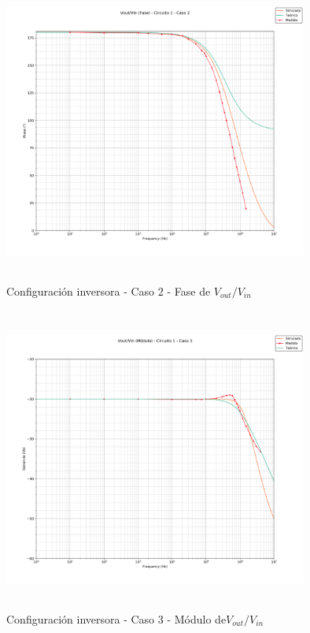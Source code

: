 \begin{figure}[H] %
	\centering
	\includegraphics[width=10cm,height=10cm,keepaspectratio]{../EJ1/00GRAFICOS/c1c2/c1c2voviFASE.png}
	\caption{Configuración inversora - Caso 2 - Fase de $V_{out}/V_{in}$ }
	\label{c1c2voviP}
\end{figure}

\begin{figure}[H] %
	\centering
	\includegraphics[width=10cm,height=10cm,keepaspectratio]{../EJ1/00GRAFICOS/c1c3/c1c3voviMod.png}
	\caption{Configuración inversora - Caso 3 - M\'odulo de$V_{out}/V_{in}$}	
	\label{c1c3voviM}
\end{figure}

